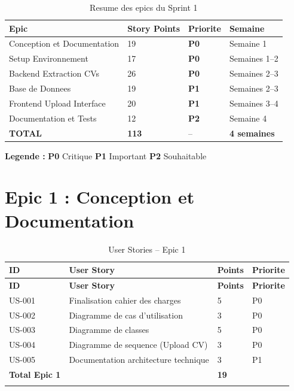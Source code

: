 ﻿\documentclass[12pt,a4paper]{report}
\begin{document}
\begin{table}[H]
\centering
\begin{tabular}{|p{5cm}|p{2.5cm}|p{2cm}|p{3cm}|}
\hline
\rowcolor{bleu3S!20}
\textbf{Epic} & \textbf{Story Points} & \textbf{Priorite} & \textbf{Semaine} \\
\hline
Conception et Documentation & 19 & \textcolor{rouge}{\textbf{P0}} & Semaine 1 \\
\hline
Setup Environnement & 17 & \textcolor{rouge}{\textbf{P0}} & Semaines 1--2 \\
\hline
Backend Extraction CVs & 26 & \textcolor{rouge}{\textbf{P0}} & Semaines 2--3 \\
\hline
Base de Donnees & 19 & \textcolor{orangecol}{\textbf{P1}} & Semaines 2--3 \\
\hline
Frontend Upload Interface & 20 & \textcolor{orangecol}{\textbf{P1}} & Semaines 3--4 \\
\hline
Documentation et Tests & 12 & \textcolor{vertcol}{\textbf{P2}} & Semaine 4 \\
\hline
\rowcolor{grisleger}
\textbf{TOTAL} & \textbf{113} & -- & \textbf{4 semaines} \\
\hline
\end{tabular}
\caption{Resume des epics du Sprint 1}
\end{table}

\textbf{Legende :} \textcolor{rouge}{\textbf{P0}} Critique \quad \textcolor{orangecol}{\textbf{P1}} Important \quad \textcolor{vertcol}{\textbf{P2}} Souhaitable

\section{Epic 1 : Conception et Documentation}

\begin{longtable}{|p{1.5cm}|p{7cm}|p{2cm}|p{2cm}|}
\hline
\rowcolor{bleu3S!20}
\textbf{ID} & \textbf{User Story} & \textbf{Points} & \textbf{Priorite} \\
\hline
\endfirsthead
\hline \rowcolor{bleu3S!20} \textbf{ID} & \textbf{User Story} & \textbf{Points} & \textbf{Priorite} \\ \hline
\endhead
US-001 & Finalisation cahier des charges & 5 & P0 \\ \hline
US-002 & Diagramme de cas d'utilisation & 3 & P0 \\ \hline
US-003 & Diagramme de classes & 5 & P0 \\ \hline
US-004 & Diagramme de sequence (Upload CV) & 3 & P0 \\ \hline
US-005 & Documentation architecture technique & 3 & P1 \\ \hline
\rowcolor{grisleger} \textbf{Total Epic 1} & & \textbf{19} & \\ \hline
\caption{User Stories -- Epic 1}
\end{longtable}
\end{document}
